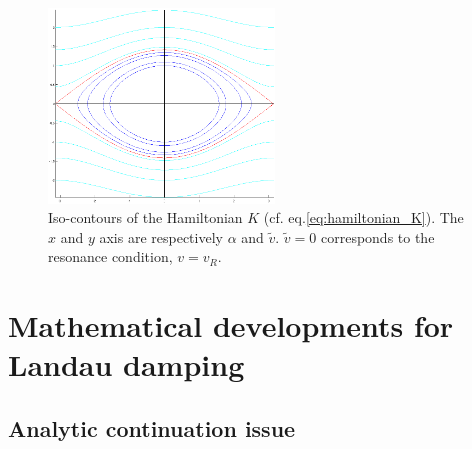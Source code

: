 \documentclass[11pt]{article}
\begin{document}
\begin{figure}[!h]
	\begin{center}
		\includegraphics[width=6cm]{Figures/Fig_island.png}
		\caption{Iso-contours of the Hamiltonian $K$ (cf. eq.\eqref{eq:hamiltonian_K}). The $x$ and $y$ axis are respectively $\alpha$ and $\tilde v$. $\tilde v=0$ corresponds to the resonance condition, $v=v_R$.} \label{fig_island}
	\end{center}
\end{figure}


\newpage
\appendix
\section{Mathematical developments for Landau damping}
\label{Appendix_Landau}

\subsection{Analytic continuation issue}
\end{document}
